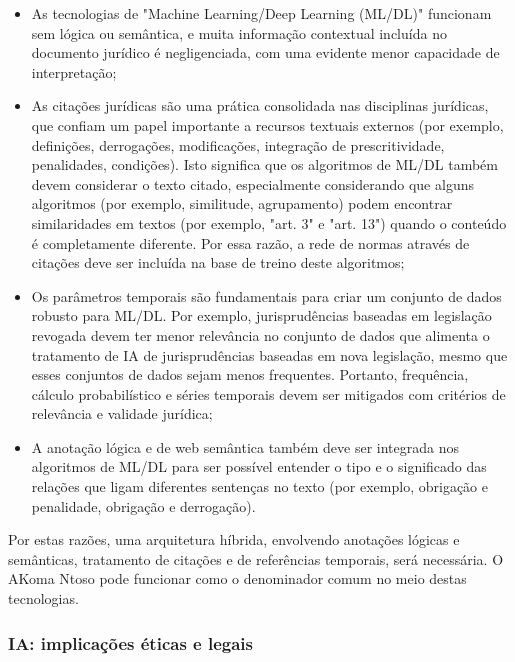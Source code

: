 \begin{itemize}
    \item As tecnologias de "Machine Learning/Deep Learning (ML/DL)" funcionam sem lógica ou semântica, e muita informação 
    contextual incluída no documento jurídico é negligenciada, com uma evidente menor capacidade de interpretação;

    \item As citações jurídicas são uma prática consolidada nas disciplinas jurídicas, que confiam um papel importante a 
    recursos textuais externos (por exemplo, definições, derrogações, modificações, integração de prescritividade, penalidades, 
    condições). Isto significa que os algoritmos de ML/DL também devem considerar o texto citado, especialmente considerando 
    que alguns algoritmos (por exemplo, similitude, agrupamento) podem encontrar similaridades em textos 
    (por exemplo, "art. 3" e "art. 13") quando o conteúdo é completamente diferente. Por essa razão, a rede de normas através 
    de citações deve ser incluída na base de treino deste algoritmos;

    \item Os parâmetros temporais são fundamentais para criar um conjunto de dados robusto para ML/DL. 
    Por exemplo, jurisprudências baseadas em legislação revogada devem ter menor relevância no conjunto de dados que alimenta 
    o tratamento de IA de jurisprudências baseadas em nova legislação, mesmo que esses conjuntos de dados sejam menos frequentes. 
    Portanto, frequência, cálculo probabilístico e séries temporais devem ser mitigados com critérios de relevância e validade 
    jurídica;

    \item A anotação lógica e de web semântica também deve ser integrada nos algoritmos de ML/DL para ser possível 
    entender o tipo e o significado das relações que ligam diferentes sentenças no texto (por exemplo, obrigação e 
    penalidade, obrigação e derrogação).

\end{itemize}

Por estas razões, uma arquitetura híbrida, envolvendo anotações lógicas e semânticas, tratamento de citações e de referências 
temporais, será necessária. O AKoma Ntoso pode funcionar como o denominador comum no meio destas tecnologias.


\subsubsection{IA: implicações éticas e legais}

